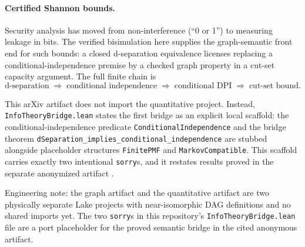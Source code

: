 \documentclass[acmsmall,screen,nonacm]{acmart}
\newcommand{\lean}[1]{\lstinline!#1!}
\begin{document}
\paragraph{Certified Shannon bounds.} Security analysis has moved from
non-interference (``0 or 1'') to measuring leakage in bits.  The verified
bisimulation here supplies the graph-semantic front end for such bounds: a
closed d-separation equivalence licenses replacing a conditional-independence
premise by a checked graph property in a cut-set capacity argument.  The full
finite chain is
\[
\text{d-separation} \;\Rightarrow\; \text{conditional independence}
\;\Rightarrow\; \text{conditional DPI} \;\Rightarrow\; \text{cut-set bound}.
\]

This arXiv artifact does not import the quantitative project.  Instead,
\lean{InfoTheoryBridge.lean} states the first bridge as an explicit local
scaffold: the conditional-independence predicate \lean{ConditionalIndependence}
and the bridge theorem
\lean{dSeparation_implies_conditional_independence}
are stubbed alongside placeholder structures \lean{FinitePMF} and
\lean{MarkovCompatible}.  This scaffold carries exactly two intentional
\lean{sorry}s, and it restates results proved in the separate anonymized
artifact \cite{companionqif}.

Engineering note: the graph artifact and the quantitative artifact are two
physically separate Lake projects with near-isomorphic DAG definitions and no
shared imports yet. The two \lean{sorry}s in this repository's
\lean{InfoTheoryBridge.lean} file are a port placeholder for the proved
semantic bridge in the cited anonymous artifact.
\end{document}
